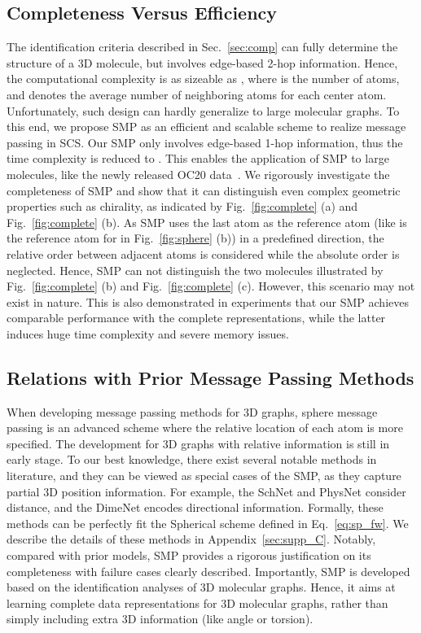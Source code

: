 \documentclass{article}
\begin{document}
\subsection{Completeness Versus Efficiency} \label{sec:comp_effi}
The identification criteria described in Sec.~\ref{sec:comp}
can fully determine the structure of a 3D molecule, but
involves edge-based 2-hop information.
Hence, the computational complexity is as sizeable as ,
where  is the number of atoms, and  denotes the average number
of neighboring atoms for each center atom.
Unfortunately, such design can hardly generalize to 
large molecular graphs.
To this end, we propose SMP as an efficient and scalable scheme to
realize message passing in SCS.
Our SMP only involves edge-based 1-hop information,
thus the time complexity is reduced to .
This enables the application of SMP to large molecules,
like the newly released OC20 data~\citep{chanussot2020open}.
We rigorously investigate the completeness of SMP and 
show that it can distinguish even complex geometric 
properties such as chirality, as indicated by Fig.~\ref{fig:complete} (a) and Fig.~\ref{fig:complete} (b).
As SMP uses the last atom as the reference atom (like  is the reference atom for  in Fig.~\ref{fig:sphere} (b)) in a predefined direction, the relative order between adjacent atoms is considered while the absolute order is neglected.
Hence, SMP can not distinguish the two molecules illustrated by Fig.~\ref{fig:complete} (b) and Fig.~\ref{fig:complete} (c).
However, this scenario may not exist in nature. This is also demonstrated in experiments
that our SMP achieves comparable performance with the complete representations, while the latter
induces huge time complexity and severe memory issues.

\subsection{Relations with Prior Message Passing Methods}
When developing message passing methods for 3D graphs,
sphere message passing is an advanced scheme
where the relative location of each atom is more specified.
The development for 3D graphs with relative information is still in early stage.
To our best knowledge, there exist several notable methods
in literature, and they can be viewed
as special cases of the SMP, as they capture partial 3D position information.
For example, the SchNet and PhysNet consider distance, and 
the DimeNet encodes directional information.
Formally, these methods can be perfectly fit 
the Spherical scheme defined in Eq.~\ref{eq:sp_fw}.
We describe the details of these methods in Appendix~\ref{sec:supp_C}.
Notably, compared with prior models, SMP
provides a rigorous justification on 
its completeness
with failure cases clearly described.
Importantly, SMP is developed based on the
identification analyses of 3D molecular graphs.
Hence, it aims at learning complete data representations for 3D molecular graphs, rather than simply including extra 3D information (like angle or torsion). 
\end{document}
